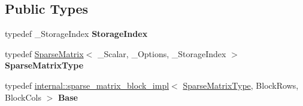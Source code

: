 \subsection*{Public Types}
\begin{DoxyCompactItemize}
\item 
\mbox{\label{class_eigen_1_1_block_impl_3_01_sparse_matrix_3_01___scalar_00_01___options_00_01___storage_inded3daac10033a16d6ca9aea81cdfe7eee_a573dd898bd9d3a24a15e2e03454b17cd}} 
typedef \+\_\+\+Storage\+Index {\bfseries Storage\+Index}
\item 
\mbox{\label{class_eigen_1_1_block_impl_3_01_sparse_matrix_3_01___scalar_00_01___options_00_01___storage_inded3daac10033a16d6ca9aea81cdfe7eee_a1d362d9a3e5d04fb463d11ff6ffbf75d}} 
typedef \mbox{\hyperlink{class_eigen_1_1_sparse_matrix}{Sparse\+Matrix}}$<$ \+\_\+\+Scalar, \+\_\+\+Options, \+\_\+\+Storage\+Index $>$ {\bfseries Sparse\+Matrix\+Type}
\item 
\mbox{\label{class_eigen_1_1_block_impl_3_01_sparse_matrix_3_01___scalar_00_01___options_00_01___storage_inded3daac10033a16d6ca9aea81cdfe7eee_a849e4149fbbc22773bfd8d841a6660d2}} 
typedef \mbox{\hyperlink{class_eigen_1_1internal_1_1sparse__matrix__block__impl}{internal\+::sparse\+\_\+matrix\+\_\+block\+\_\+impl}}$<$ \mbox{\hyperlink{class_eigen_1_1_sparse_matrix}{Sparse\+Matrix\+Type}}, Block\+Rows, Block\+Cols $>$ {\bfseries Base}
\end{DoxyCompactItemize}
